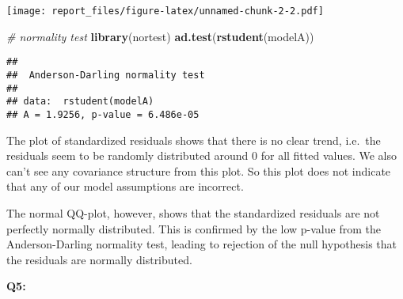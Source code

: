 \documentclass[]{article}
\newenvironment{Shaded}{\begin{snugshade}}{\end{snugshade}}
\newcommand{\KeywordTok}[1]{\textcolor[rgb]{0.13,0.29,0.53}{\textbf{#1}}}
\newcommand{\DataTypeTok}[1]{\textcolor[rgb]{0.13,0.29,0.53}{#1}}
\newcommand{\DecValTok}[1]{\textcolor[rgb]{0.00,0.00,0.81}{#1}}
\newcommand{\FloatTok}[1]{\textcolor[rgb]{0.00,0.00,0.81}{#1}}
\newcommand{\StringTok}[1]{\textcolor[rgb]{0.31,0.60,0.02}{#1}}
\newcommand{\CommentTok}[1]{\textcolor[rgb]{0.56,0.35,0.01}{\textit{#1}}}
\newcommand{\OtherTok}[1]{\textcolor[rgb]{0.56,0.35,0.01}{#1}}
\newcommand{\OperatorTok}[1]{\textcolor[rgb]{0.81,0.36,0.00}{\textbf{#1}}}
\newcommand{\NormalTok}[1]{#1}
\begin{document}
\texttt{[image: report\_files/figure-latex/unnamed-chunk-2-2.pdf]}

\begin{Shaded}
\begin{Highlighting}[]
\CommentTok{# normality test}
\KeywordTok{library}\NormalTok{(nortest) }
\KeywordTok{ad.test}\NormalTok{(}\KeywordTok{rstudent}\NormalTok{(modelA))}
\end{Highlighting}
\end{Shaded}

\begin{verbatim}
## 
##  Anderson-Darling normality test
## 
## data:  rstudent(modelA)
## A = 1.9256, p-value = 6.486e-05
\end{verbatim}

The plot of standardized residuals shows that there is no clear trend,
i.e.~the residuals seem to be randomly distributed around 0 for all
fitted values. We also can't see any covariance structure from this
plot. So this plot does not indicate that any of our model assumptions
are incorrect.

The normal QQ-plot, however, shows that the standardized residuals are
not perfectly normally distributed. This is confirmed by the low p-value
from the Anderson-Darling normality test, leading to rejection of the
null hypothesis that the residuals are normally distributed.

\textbf{Q5:}

\begin{Shaded}
\end{Shaded}
\end{document}
